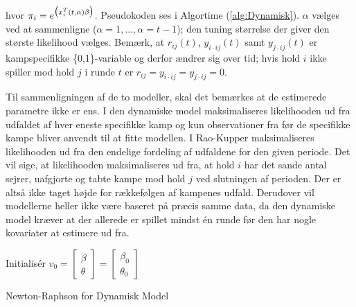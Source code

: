 \documentclass[11pt,a4paper]{article}
\begin{document}
hvor $\pi_i=e^{\big{(}x_i^T(t,\alpha)\beta\big{)}}$. Pseudokoden ses i Algortime (\ref{alg:Dynamisk}). $\alpha$ vælges ved at sammenligne ($\alpha=1,...,\alpha=t-1$); den tuning størrelse der giver den største likelihood vælges. Bemærk, at $r_{ij}(t)$, $y_{i\cdot ij}(t)$ samt $y_{j\cdot ij}(t)$ er kampspecifikke \{0,1\}-variable og derfor ændrer sig over tid; hvis hold $i$ ikke spiller mod hold $j$ i runde $t$ er $r_{ij}=y_{i\cdot ij}=y_{j\cdot ij}=0$.\\\par
Til sammenligningen af de to modeller, skal det bemærkes at de estimerede parametre ikke er ens. I den dynamiske model maksimaliseres likelihooden ud fra udfaldet af hver eneste specifikke kamp og kun observationer fra før de specifikke kampe bliver anvendt til at fitte modellen. I Rao-Kupper maksimaliseres likelihooden ud fra den endelige fordeling af udfaldene for den given periode. Det vil sige, at likelihooden maksimaliseres ud fra, at hold $i$ har det sande antal sejrer, uafgjorte og tabte kampe mod hold $j$ ved slutningen af perioden. Der er altså ikke taget højde for rækkefølgen af kampenes udfald. Derudover vil modellerne heller ikke være baseret på præcis samme data, da den dynamiske model kræver at der allerede er spillet mindst én runde før den har nogle kovariater at estimere ud fra. 
\begin{algorithm}[H]
\SetAlgoLined
{}
 Initialisér $v_0 = \begin{bmatrix}
           \beta \\
           \theta
         \end{bmatrix} =\begin{bmatrix}
           \beta_0 \\
           \theta_0
         \end{bmatrix}\;$\\
\caption{Newton-Raphson for Dynamisk Model}\label{alg:Dynamisk}
\end{algorithm}
\end{document}
